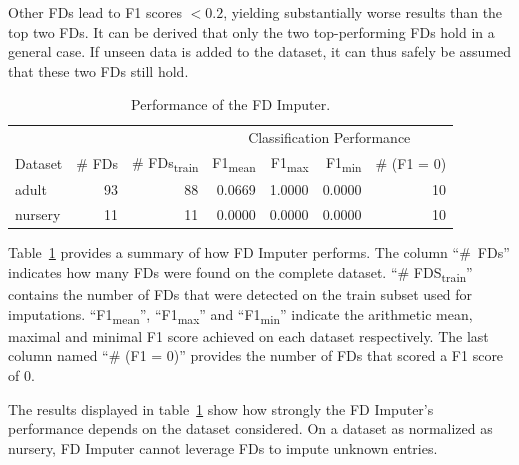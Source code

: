 Other FDs lead to F1 scores \(< 0.2\), yielding substantially worse results than the top two FDs.
It can be derived that only the two top-performing FDs hold in a general case.
If unseen data is added to the dataset, it can thus safely be assumed that these two FDs still hold.

\begin{table}[ht]
    \centering
    \begin{tabular}{lrrrrrr}
        \toprule
        & & & \multicolumn{4}{c}{Classification Performance} \\
        \cmidrule(lr{.25em}){4-7}
        Dataset & \# FDs & \# FDs\textsubscript{train} & F1\textsubscript{mean} & F1\textsubscript{max} & F1\textsubscript{min} & \# (F1 = 0) \\
        \midrule
        adult & 93 & 88 & 0.0669 & 1.0000 & 0.0000 & 10 \\
        nursery & 11 & 11 & 0.0000 & 0.0000 & 0.0000 & 10 \\
        \bottomrule
    \end{tabular}
    \caption{Performance of the FD Imputer.}\label{tab:fd-imputer-performance}
\end{table}

Table~\ref{tab:fd-imputer-performance} provides a summary of how FD Imputer performs.
The column ``\#~FDs'' indicates how many FDs were found on the complete dataset.
``\# FDS\textsubscript{train}'' contains the number of FDs that were detected on the train subset used for imputations.
``F1\textsubscript{mean}'', ``F1\textsubscript{max}'' and ``F1\textsubscript{min}'' indicate the arithmetic mean, maximal and minimal F1 score achieved on each dataset respectively.
The last column named ``\# (F1 = 0)'' provides the number of FDs that scored a F1 score of 0.

The results displayed in table~\ref{tab:fd-imputer-performance} show how strongly the FD Imputer's performance depends on the dataset considered.
On a dataset as normalized as nursery, FD Imputer cannot leverage FDs to impute unknown entries.

